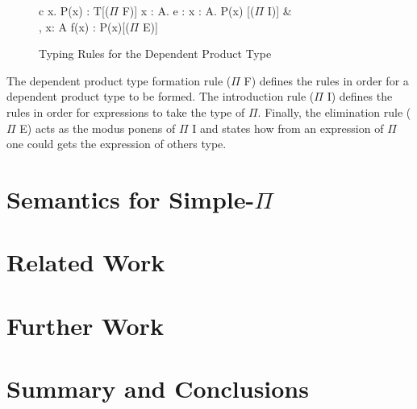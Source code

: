 \documentclass[a4paper,12pt]{report}
\begin{document}
\begin{figure}[H]
  \begin{center}
    \begin{tabular} {c}
        {\Gamma \vdash \Pi x. P(x) : T}[($\Pi$ F)] \text{ }
        {\Gamma \vdash \lambda x : A. e : \Pi x : A. P(x) }[($\Pi$ I)] & \\
        {\Gamma, x: A \vdash f(x) : P(x)}[($\Pi$ E)] \text{ }
    \end{tabular}
  \end{center}
  \caption{Typing Rules for the Dependent Product Type}
\end{figure}

\par
The dependent product type formation rule ($\Pi$ F) defines the rules in order 
for a dependent product type to be formed. The introduction rule ($\Pi$ I) 
defines the rules in order for expressions to take the type of $\Pi$. Finally, 
the elimination rule ($\Pi$ E) acts as the modus ponens of $\Pi$ I and states 
how from an expression of $\Pi$ one could gets the expression of others type. 




\chapter{Semantics for Simple-$\Pi$}

\chapter{Related Work}

\chapter{Further Work}

\chapter{Summary and Conclusions} 


\appendix
\singlespacing

\printbibliography
\end{document}
